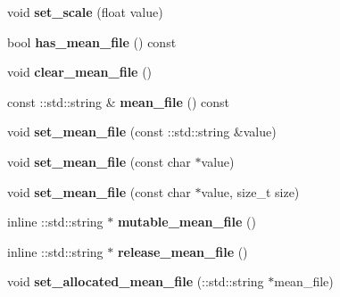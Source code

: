 \begin{DoxyCompactItemize}
void {\bfseries set\+\_\+scale} (float value)
\item 
\mbox{\label{classcaffe_1_1_image_data_parameter_a9b9e8f48553b89626e7acba5d01ca2e0}} 
bool {\bfseries has\+\_\+mean\+\_\+file} () const
\item 
\mbox{\label{classcaffe_1_1_image_data_parameter_a66eb53fab060e8605f4c10897c61d9f5}} 
void {\bfseries clear\+\_\+mean\+\_\+file} ()
\item 
\mbox{\label{classcaffe_1_1_image_data_parameter_ad0727760a0041b7e5ee4d7c2833ddeca}} 
const \+::std\+::string \& {\bfseries mean\+\_\+file} () const
\item 
\mbox{\label{classcaffe_1_1_image_data_parameter_a9f9dc2eb045450e2b292b7c0fa945422}} 
void {\bfseries set\+\_\+mean\+\_\+file} (const \+::std\+::string \&value)
\item 
\mbox{\label{classcaffe_1_1_image_data_parameter_a800112efaa6170ea143515dda01847f2}} 
void {\bfseries set\+\_\+mean\+\_\+file} (const char $\ast$value)
\item 
\mbox{\label{classcaffe_1_1_image_data_parameter_ad61d4e02ae0a705655e414346d84e6dd}} 
void {\bfseries set\+\_\+mean\+\_\+file} (const char $\ast$value, size\+\_\+t size)
\item 
\mbox{\label{classcaffe_1_1_image_data_parameter_aeea2db33edf2c4f162f16262bf7c7482}} 
inline \+::std\+::string $\ast$ {\bfseries mutable\+\_\+mean\+\_\+file} ()
\item 
\mbox{\label{classcaffe_1_1_image_data_parameter_a548d6fe44c5686e314c84f9318133f89}} 
inline \+::std\+::string $\ast$ {\bfseries release\+\_\+mean\+\_\+file} ()
\item 
\mbox{\label{classcaffe_1_1_image_data_parameter_a7822695da657574950f40da000ac70cd}} 
void {\bfseries set\+\_\+allocated\+\_\+mean\+\_\+file} (\+::std\+::string $\ast$mean\+\_\+file)

\end{DoxyCompactItemize}
